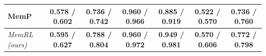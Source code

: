 \documentclass{article}
\theoremstyle{plain}
\theoremstyle{definition}
\theoremstyle{remark}
\begin{document}
\begin{table}[t]
\begin{tabular}{l c c c c c c}
MemP            & 0.578 / 0.602 & 0.736 / 0.742 & \textbf{0.960} / 0.966 & 0.885 / 0.919 & 0.522 / 0.570 & 0.736 / 0.760 \\
\midrule
\textit{MemRL (ours)}       & \textbf{0.595 / 0.627} & \textbf{0.788 / 0.804} & \textbf{0.960 / 0.972} & \textbf{0.949 / 0.981} & \textbf{0.570 / 0.606} & \textbf{0.772 / 0.798} \\
\bottomrule
\end{tabular}
\end{table}
\end{document}
